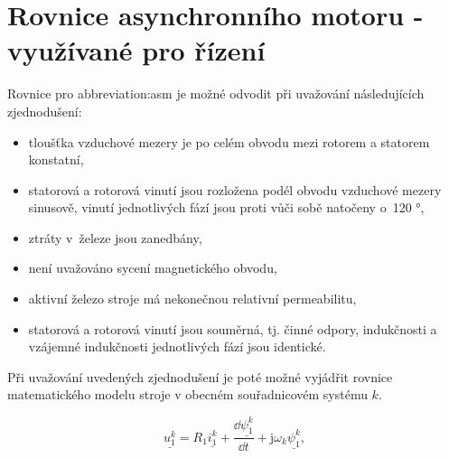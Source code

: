 \documentclass[a4paper, twoside, 11pt]{article}
\begin{document}


\tableofcontents
\newpage%
\flushbottom %
\newpage
\vspace{0pt}
\listoffigures %
\flushbottom %
\newpage
\listoftables
\flushbottom
\newpage


\null\newpage
\setcounter{page}{1}

\section{Rovnice asynchronního motoru - využívané pro řízení}
Rovnice pro \gls{abbreviation:asm} je možné odvodit při uvažování následujících zjednodušení:

\begin{itemize}
    \item tloušťka vzduchové mezery je po celém obvodu mezi rotorem a statorem konstatní,
    \item statorová a rotorová vinutí jsou rozložena podél obvodu vzduchové mezery sinusově, vinutí jednotlivých fází jsou proti vůči sobě natočeny o~120 °,
    \item ztráty v~železe jsou zanedbány,
    \item není uvažováno sycení magnetického obvodu,
    \item aktivní železo stroje má nekonečnou relativní permeabilitu,
    \item statorová a rotorová vinutí jsou souměrná, tj. činné odpory, indukčnosti a vzájemné indukčnosti jednotlivých fází jsou identické.
\end{itemize}

Při uvažování uvedených zjednodušení je poté možné vyjádřit rovnice matematického modelu stroje v obecném souřadnicovém systému $k$.

 \begin{equation}
     \underline{u_{1}^{k}} = R_1 \underline{i_1^{k}} + \frac{\dd{\underline{\psi_1^{k}}}}{\dd{t}} + \text{j} \omega_k \underline{\psi_1^{k}},
    \end{equation}
\end{document}
